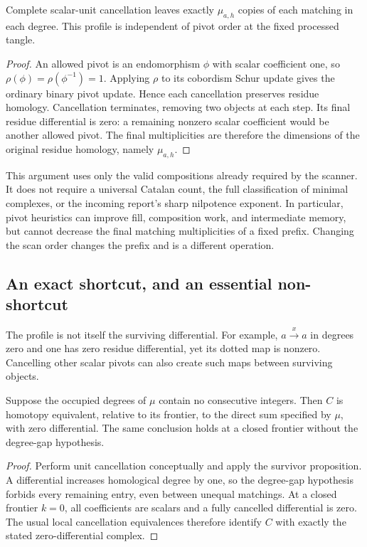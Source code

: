 \begin{proposition}
Complete scalar-unit cancellation leaves exactly $\mu_{a,h}$ copies
of each matching in each degree. This profile is independent of pivot
order at the fixed processed tangle.
\end{proposition}
\begin{proof}
An allowed pivot is an endomorphism $\phi$ with scalar coefficient one,
so $\rho(\phi)=\rho(\phi^{-1})=1$. Applying $\rho$ to its cobordism
Schur update gives the ordinary binary pivot update. Hence each
cancellation preserves residue homology. Cancellation terminates,
removing two objects at each step. Its final residue differential is
zero: a remaining nonzero scalar coefficient would be another allowed
pivot. The final multiplicities are therefore the dimensions of the
original residue homology, namely $\mu_{a,h}$.
\end{proof}

This argument uses only the valid compositions already required by the
scanner. It does not require a universal Catalan count, the full
classification of minimal complexes, or the incoming report's sharp
nilpotence exponent. In particular, pivot heuristics can improve fill,
composition work, and intermediate memory, but cannot decrease the
final matching multiplicities of a fixed prefix. Changing the scan
order changes the prefix and is a different operation.

\subsection{An exact shortcut, and an essential non-shortcut}
The profile is not itself the surviving differential. For example,
$a\xrightarrow{x}a$ in degrees zero and one has zero residue
differential, yet its dotted map is nonzero. Cancelling other scalar
pivots can also create such maps between surviving objects.

\begin{proposition}
Suppose the occupied degrees of $\mu$ contain no consecutive integers.
Then $C$ is homotopy equivalent, relative to its frontier, to the direct
sum specified by $\mu$, with zero differential. The same conclusion
holds at a closed frontier without the degree-gap hypothesis.
\end{proposition}
\begin{proof}
Perform unit cancellation conceptually and apply the survivor
proposition. A differential increases homological degree by one, so
the degree-gap hypothesis forbids every remaining entry, even between
unequal matchings. At a closed frontier $k=0$, all coefficients are
scalars and a fully cancelled differential is zero. The usual local
cancellation equivalences therefore identify $C$ with exactly the
stated zero-differential complex.
\end{proof}

